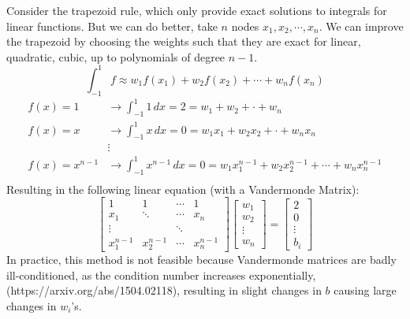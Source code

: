 \documentclass[12pt]{article}
\begin{document}
Consider the trapezoid rule, which only provide exact solutions to integrals for linear functions.
But we can do better, take $n$ nodes $x_{1},x_{2},\cdots,x_{n}$. We can improve the trapezoid by choosing the weights such that they are exact for linear, quadratic, cubic, up to polynomials of degree $n-1$.\\
\begin{equation}
	\int_{-1}^{1}f \approx w_{1}f(x_{1})+w_{2}f(x_{2})+\cdots+w_{n}f(x_{n})
\end{equation}
\begin{align*}
	f(x)=1       & \to  \int_{-1}^{1}1 \,dx =  2 =            w_{1}+w_{2}+\cdot +w_{n}                                        \\
	f(x)=x       & \to  \int_{-1}^{1}x \,dx =  0 =            w_{1}x_{1}+w_{2}x_{2}+ \cdot +w_{n}x_{n}                        \\
	             & \vdots                                                                                                     \\
	f(x)=x^{n-1} & \to  \int_{-1}^{1}x^{n-1} \,dx =  0 =            w_{1}x_{1}^{n-1}+w_{2}x_{2}^{n-1}+\cdots+w_{n}x_{n}^{n-1} \\
\end{align*}
Resulting in the following linear equation (with a Vandermonde Matrix):
\[
	\begin{bmatrix}
		1           & 1           & \cdots & 1           \\
		x_{1}       & \ddots      & \cdots & x_{n}       \\
		\vdots      &             & \ddots &             \\
		x_{1}^{n-1} & x_{2}^{n-1} & \cdots & x_{n}^{n-1}
	\end{bmatrix}
	\begin{bmatrix}
		w_{1} \\ w_{2} \\ \vdots \\ w_{n}
	\end{bmatrix}
	=
	\begin{bmatrix}
		2 \\ 0 \\ \vdots \\ b_{i}
	\end{bmatrix}
\]
In practice, this method is not feasible because Vandermonde matrices are badly ill-conditioned, as the condition number increases exponentially, (https://arxiv.org/abs/1504.02118), resulting in slight changes in $b$ causing large changes in $w_{i}$'s.
\end{document}
